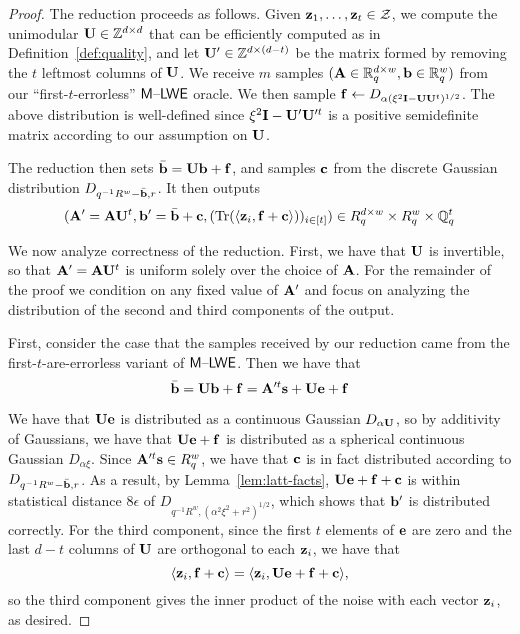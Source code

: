 \begin{proof}
The reduction proceeds as follows. Given $\mathbf{z}_1, \ldots, \mathbf{z}_t \in
\mathcal{Z}$, we compute the unimodular $\mathbf{U} \in \mathbb{Z}^{d \times d}$ that can
be efficiently computed as in Definition~\ref{def:quality}, and let
$\mathbf{U}' \in \mathbb{Z}^{d \times (d-t)}$ be the matrix formed by removing the
  $t$ leftmost columns of $\mathbf{U}$. We receive $m$ samples $(\mathbf{A} \in
  \mathbb{R}_q^{d \times w}, \mathbf{b} \in \mathbb{R}_q^{w})$ from our
  ``first-$t$-errorless'' $\mathsf{M \text{\textendash} LWE}$ oracle. We
  then sample 
$\mathbf{f} \gets D_{\alpha(\xi^2\mathbf{I}-\mathbf{U}\mathbf{U}^t)^{1/2}}$. The above distribution is well-defined since
  $\xi^2\mathbf{I}-\mathbf{U}'\mathbf{U}'^t$ is a positive semidefinite matrix
  according to our assumption on $\mathbf{U}$. 

The reduction then sets $\bar{\mathbf{b}}=\mathbf{U}\mathbf{b}+\mathbf{f}$, and samples 
$\mathbf{c}$ from the discrete Gaussian distribution
$D_{q^{-1}R^{w}-\bar{\mathbf{b}},r}$. It then outputs 
\[(\mathbf{A}'=\mathbf{A}\mathbf{U}^t,\mathbf{b}'=\bar{\mathbf{b}}+\mathbf{c},(\operatorname{Tr}(\langle\mathbf{z}_i,\mathbf{f}+\mathbf{c}\rangle))_{i
  \in [t]}) \in R_q^{d \times w} \times R_q^{w} \times \mathbb{Q}_q^{t}\]

We now analyze correctness of the reduction. First, we have that
$\mathbf{U}$ is invertible, so that $\mathbf{A}'=\mathbf{A}\mathbf{U}^{t}$ is uniform
solely over the choice of $\mathbf{A}$. For the remainder of the proof we
condition on any fixed value of $\mathbf{A}'$ and focus on analyzing the
distribution of the second and third components of the output.

First, consider the case that the samples received by our reduction
came from the first-$t$-are-errorless variant of $\mathsf{M \text{\textendash} LWE}$. Then we have
that 
\[\bar{\mathbf{b}}=\mathbf{U}\mathbf{b}+\mathbf{f}=\mathbf{A}'^t\mathbf{s}+\mathbf{U}\mathbf{e}+\mathbf{f} \]

We have that $\mathbf{U}\mathbf{e}$ is distributed as a continuous Gaussian
$D_{\alpha\mathbf{U}}$, so by additivity of Gaussians, we have that
$\mathbf{U}\mathbf{e}+\mathbf{f}$ is distributed as a spherical continuous Gaussian
$D_{\alpha\xi}$. Since $\mathbf{A}'^{t}\mathbf{s} \in R_q^w$, we have
that $\mathbf{c}$ is in fact distributed according to
$D_{q^{-1}R^{w}-\bar{\mathbf{b}},r}$.  As a result, by
Lemma~\ref{lem:latt-facts}, 
$\mathbf{U}\mathbf{e}+\mathbf{f}+\mathbf{c}$ is within statistical distance $8\epsilon$ of
$D_{q^{-1}R^{w},(\alpha^2\xi^2+r^2)^{1/2}}$, which shows that $\mathbf{b}'$
is distributed correctly. For the third component, since
the first $t$ elements of $\mathbf{e}$ are zero and the last $d-t$
columns of $\mathbf{U}$ are orthogonal to each $\mathbf{z}_i$, we have that 
\[\langle\mathbf{z}_i,\mathbf{f}+\mathbf{c}\rangle=\langle\mathbf{z}_i,\mathbf{U}\mathbf{e}+\mathbf{f}+\mathbf{c}\rangle,\]
so the third component gives the inner product of the noise with each
vector $\mathbf{z}_i$, as desired. 


\end{proof}
